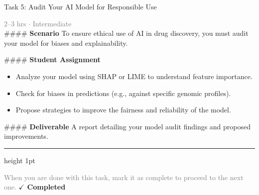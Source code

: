 \documentclass[10pt,a4paper]{article}
\begin{document}
\begin{taskbox}{Task 5: Audit Your AI Model for Responsible Use}

    {\small \textcolor{gray}{2--3 hrs $\cdot$ Intermediate}}\\[12pt]

    \#\#\#\# \textbf{Scenario}
To ensure ethical use of AI in drug discovery, you must audit your model for biases and explainability.

\#\#\#\# \textbf{Student Assignment}
\begin{itemize}
    \item Analyze your model using SHAP or LIME to understand feature importance.
    \item Check for biases in predictions (e.g., against specific genomic profiles).
    \item Propose strategies to improve the fairness and reliability of the model.
\end{itemize}

\#\#\#\# \textbf{Deliverable}
A report detailing your model audit findings and proposed improvements.\par

    \vspace{16pt}

    \textcolor{cardBorder}{\hrule height 1pt}\vspace{8pt}

    \small \textcolor{gray}{When you are done with this task, mark it as complete to proceed to the next one.} \hfill \textbf{\textcolor{brandDark}{$\checkmark$ Completed}}

\end{taskbox}
\end{document}
